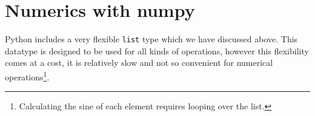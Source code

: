 \documentclass[10pt,a4paper]{article}
\begin{document}
%
%
%
%
\section{Numerics with numpy}
Python includes a very flexible \verb|list| type which we have discussed above.
This datatype is designed to be used for all kinds of operations, however this flexibility comes at a cost, it is relatively slow and not so convenient for numerical operations\footnote{Calculating the sine of each element requires looping over the list.}.
\end{document}
